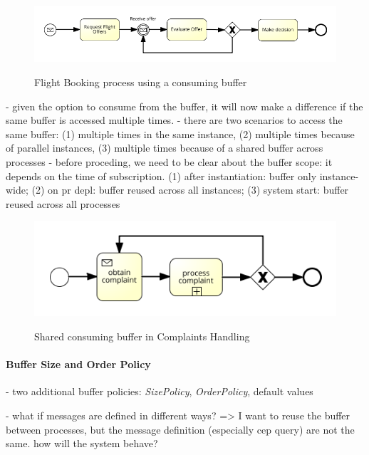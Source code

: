 \begin{figure}[]
	\myfloatalign
	{\includegraphics[width=1\linewidth]{chapters/concept/bpmnx/FlightBooking.png}}
	\caption{Flight Booking process using a consuming buffer}\label{fig:example-flightbooking}
\end{figure}



- given the option to consume from the buffer, it will now make a difference if the same buffer is accessed multiple times.
- there are two scenarios to access the same buffer: (1) multiple times in the same instance, (2) multiple times because of parallel instances, (3) multiple times because of a shared buffer across processes
- before proceding, we need to be clear about the buffer scope: it depends on the time of subscription. (1) after instantiation: buffer only instance-wide; (2) on pr depl: buffer reused across all instances; (3) system start: buffer reused across all processes

\begin{figure}[]
	\myfloatalign
	{\includegraphics[width=1\linewidth]{chapters/concept/bpmnx/ComplaintProcessing.png}}
	\caption{Shared consuming buffer in Complaints Handling}\label{fig:example-complaints}
\end{figure}

\paragraph{Buffer Size and Order Policy\newline}

- two additional buffer policies: \textit{SizePolicy}, \textit{OrderPolicy}, default values

- what if messages are defined in different ways? => I want to reuse the buffer between processes, but the message definition (especially cep query) are not the same. how will the system behave?
